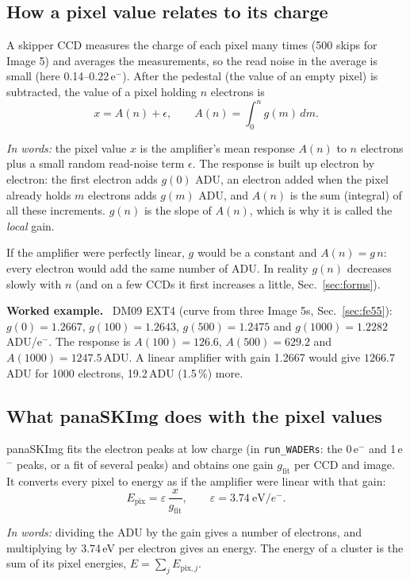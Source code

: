 \documentclass[11pt,a4paper]{article}
\newcommand{\code}[1]{\texttt{#1}}
\newcommand{\eminus}{e$^-$}
\newcommand{\gfit}{g_{\mathrm{fit}}}
\newenvironment{example}%
  {\par\smallskip\noindent\begin{lrbox}{\exbox}\begin{minipage}{0.96\linewidth}\small\textbf{Worked example.}\ }%
  {\end{minipage}\end{lrbox}\colorbox{black!6}{\usebox{\exbox}}\par\smallskip}
\newcommand{\inwords}[1]{\par\noindent\textit{In words:} #1\par}
\begin{document}
\subsection{How a pixel value relates to its charge}
A skipper CCD measures the charge of each pixel many times (500 skips for Image 5) and averages the
measurements, so the read noise in the average is small (here 0.14--0.22\,\eminus). After the
pedestal (the value of an empty pixel) is subtracted, the value of a pixel holding $n$ electrons is
\begin{equation}
x = A(n) + \epsilon, \qquad A(n) = \int_0^n g(m)\,dm .
\label{eq:A}
\end{equation}
\inwords{the pixel value $x$ is the amplifier's mean response $A(n)$ to $n$ electrons plus a small
random read-noise term $\epsilon$. The response is built up electron by electron: the first electron
adds $g(0)$ ADU, an electron added when the pixel already holds $m$ electrons adds $g(m)$ ADU, and
$A(n)$ is the sum (integral) of all these increments. $g(n)$ is the slope of $A(n)$, which is why
it is called the \emph{local} gain.}

If the amplifier were perfectly linear, $g$ would be a constant and $A(n) = g\,n$: every electron
would add the same number of ADU. In reality $g(n)$ decreases slowly with $n$ (and on a few CCDs it
first increases a little, Sec.~\ref{sec:forms}).

\begin{example}
DM09 EXT4 (curve from three Image 5s, Sec.~\ref{sec:fe55}): $g(0)=1.2667$, $g(100)=1.2643$,
$g(500)=1.2475$ and $g(1000)=1.2282$\,ADU/\eminus. The response is $A(100)=126.6$,
$A(500)=629.2$ and $A(1000)=1247.5$\,ADU. A linear amplifier with gain 1.2667 would give
$1266.7$\,ADU for 1000 electrons, 19.2\,ADU (1.5\,\%) more.
\end{example}

\subsection{What panaSKImg does with the pixel values}
panaSKImg fits the electron peaks at low charge (in \code{run\_WADERs}: the 0\,\eminus{} and 1\,\eminus{}
peaks, or a fit of several peaks) and obtains one gain $\gfit$ per CCD and image. It converts every
pixel to energy as if the amplifier were linear with that gain:
\begin{equation}
E_{\mathrm{pix}} = \varepsilon\,\frac{x}{\gfit}, \qquad \varepsilon = 3.74\ \mathrm{eV}/e^- .
\label{eq:epix}
\end{equation}
\inwords{dividing the ADU by the gain gives a number of electrons, and multiplying by 3.74\,eV per
electron gives an energy. The energy of a cluster is the sum of its pixel energies,
$E = \sum_j E_{\mathrm{pix},j}$.}
\end{document}
